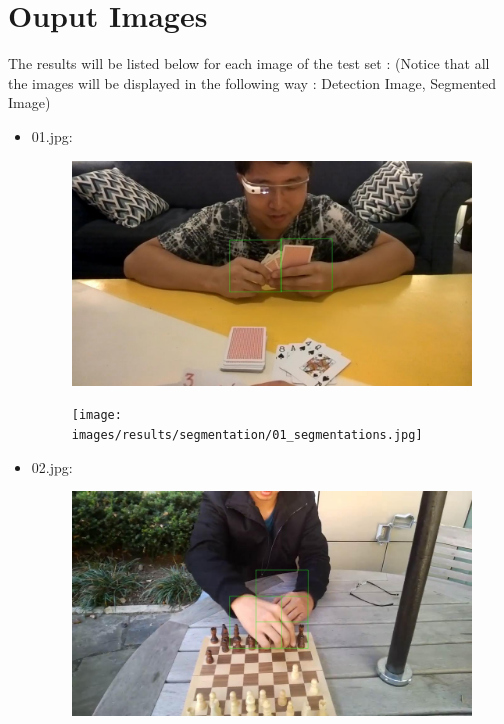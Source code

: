 \section{Ouput Images}
The results will be listed below for each image of the test set : \newline (Notice that all the images will be displayed in the following way : Detection Image, Segmented Image)
\begin{itemize}
    \item 01.jpg:
        \begin{figure}[!htb]
            \begin{minipage}{0.5\textwidth}
                \centering
                \includegraphics[scale = 0.205]{images/results/detection/01_detections.jpg}
            \end{minipage}\hfill
            \begin{minipage}{0.5\textwidth}
                \centering
                \texttt{[image: images/results/segmentation/01\_segmentations.jpg]}
            \end{minipage}
        \end{figure}
    \item 02.jpg:
        \begin{figure}[!htb]
            \begin{minipage}{0.5\textwidth}
                \centering
                \includegraphics[scale = 0.205]{images/results/detection/02_detections.jpg}

\end{minipage}
\end{figure}
\end{itemize}
